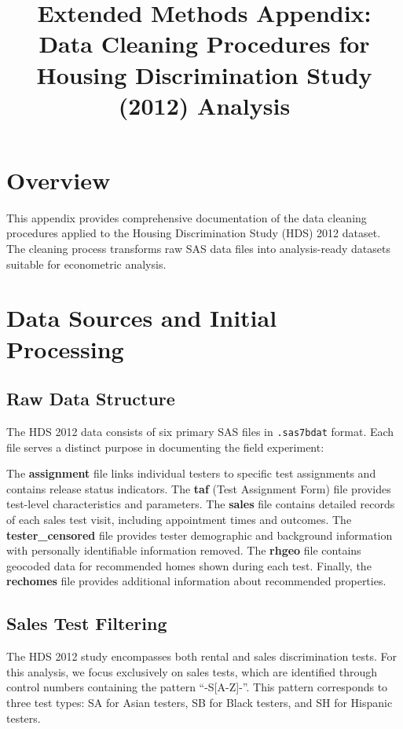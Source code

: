 \documentclass{article}
\title{Extended Methods Appendix: Data Cleaning Procedures for Housing Discrimination Study (2012) Analysis}
\author{}
\date{}
\begin{document}
\maketitle

\section{Overview}

This appendix provides comprehensive documentation of the data cleaning procedures applied to the Housing Discrimination Study (HDS) 2012 dataset. The cleaning process transforms raw SAS data files into analysis-ready datasets suitable for econometric analysis.
\section{Data Sources and Initial Processing}

\subsection{Raw Data Structure}

The HDS 2012 data consists of six primary SAS files in \texttt{.sas7bdat} format. Each file serves a distinct purpose in documenting the field experiment:

The \textbf{assignment} file links individual testers to specific test assignments and contains release status indicators. The \textbf{taf} (Test Assignment Form) file provides test-level characteristics and parameters. The \textbf{sales} file contains detailed records of each sales test visit, including appointment times and outcomes. The \textbf{tester\_censored} file provides tester demographic and background information with personally identifiable information removed. The \textbf{rhgeo} file contains geocoded data for recommended homes shown during each test. Finally, the \textbf{rechomes} file provides additional information about recommended properties.

\subsection{Sales Test Filtering}

The HDS 2012 study encompasses both rental and sales discrimination tests. For this analysis, we focus exclusively on sales tests, which are identified through control numbers containing the pattern ``-S[A-Z]-''. This pattern corresponds to three test types: SA for Asian testers, SB for Black testers, and SH for Hispanic testers.
\end{document}
